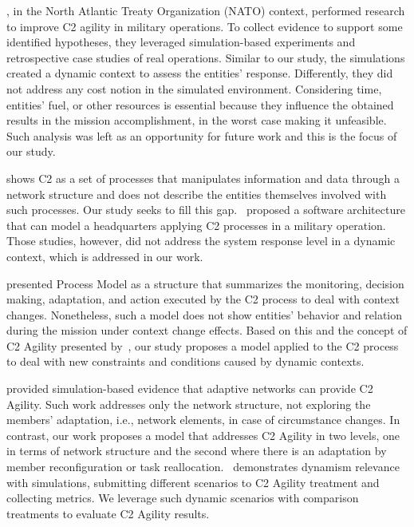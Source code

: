 \citet{FRANCE2014}, in the North Atlantic Treaty Organization (NATO) context, performed research to improve C2 agility in military operations. To collect evidence to support some identified hypotheses, they leveraged simulation-based experiments and retrospective case studies of real operations. Similar to our study, the simulations created a dynamic context to assess the entities' response. Differently, they did not address any cost notion in the simulated environment. Considering  time, entities' fuel, or other resources is essential because they influence the  obtained results in the mission accomplishment, in the worst case  making it unfeasible. Such analysis was left as an opportunity for future work and this is the focus of our study.

\citet{Swart2012} shows C2 as a set of processes that manipulates information and data through a network structure and does not describe the entities themselves involved with such processes.  Our study seeks to fill this gap.~\citet{Mason2001} proposed a software architecture that can model a headquarters applying C2 processes in a military operation. Those studies, however, did not address the system response level in a dynamic context, which is addressed in our work.

\citet{Stanton2007} presented Process Model as a structure that summarizes the monitoring, decision making,  adaptation, and action executed by the C2 process to deal with context changes. Nonetheless, such a model does not show entities' behavior and relation during the mission under context change effects. Based on this and the concept of C2 Agility presented by~\citet{Alberts10}, our study proposes a model applied to the C2 process to deal with new constraints and conditions caused by dynamic contexts. 

\citet{c2-02} provided simulation-based evidence that adaptive networks can provide C2 Agility. 
Such work addresses only the network structure, not exploring the members' adaptation, i.e., network elements, in case of circumstance changes. In contrast, our work proposes a model that addresses C2 Agility in two levels, one in terms of network structure and the second where there is an adaptation by \color{black}member reconfiguration \color{black}or task reallocation.\color{black}~\cite{UAV01} demonstrates dynamism relevance with simulations, submitting different scenarios to C2 Agility treatment and collecting metrics. We leverage such dynamic scenarios with comparison treatments to evaluate C2 Agility results.\color{black}

